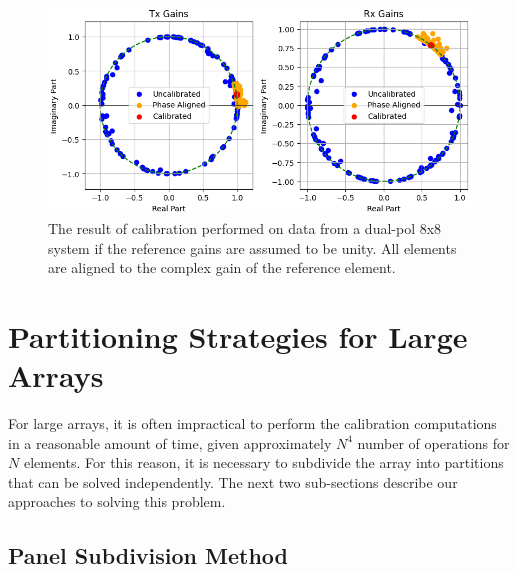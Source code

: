 \documentclass[journal]{IEEEtran}
\begin{document}
\begin{figure}[hptb]
    \centering
    \includegraphics[width=0.98\linewidth]{refGain2.png}
    \caption{The result of calibration performed on data from a dual-pol 8x8 system if the reference gains are assumed to be unity. All elements are aligned to the complex gain of the reference element.}
    \label{fig:unityRefGains}
\end{figure}





\section{Partitioning Strategies for Large Arrays}

For large arrays, it is often impractical to perform the calibration computations in a reasonable amount of time, given approximately $N^4$ number of operations for $N$ elements.
For this reason, it is necessary to subdivide the array into partitions that can be solved independently. The next two sub-sections describe our approaches to solving this problem.





\subsection{Panel Subdivision Method}
\end{document}

